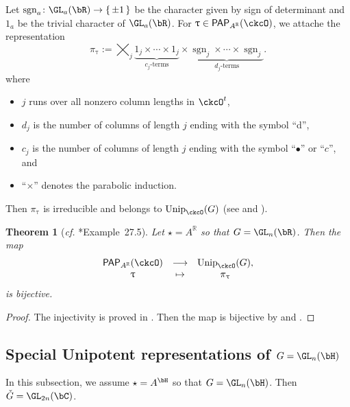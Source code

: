 \documentclass[12pt,a4paper]{amsart}
\newcommand{\sgn}{\operatorname{sgn}}
\newcommand{\R}{\mathbb R}
\numberwithin{equation}{section}
\newtheorem{thm}{Theorem}[section]
\theoremstyle{remark}
\def\cf{\emph{cf.} }
\def\Unip{\mathrm{Unip}}
\def\ckG{\check{G}}
\def\PP{\mathsf{PAP}}
\begin{document}
Let $\sgn_a\colon \GL_a(\bR)\rightarrow \set{\pm 1}$ be the character given by sign of determinant
and $1_a$ be the trivial character of $\GL_a(\bR)$.
For
$\uptau\in \PP_{A^\R}(\ckcO)$, we attache the representation
\begin{equation}\label{eq:u.GLR}
  \pi_\uptau :=
  \bigtimes_{j} \underbrace{1_j \times \cdots \times 1_j}_{c_j\text{-terms}}\times
  \underbrace{\sgn_j \times \cdots \times {\sgn_j} }_{d_j\text{-terms}}.
\end{equation}
where
\begin{itemize}
  \item $j$ runs over all nonzero column lengths in $\ckcO^t$,
  \item $d_j$ is the number of columns of length $j$ ending with the symbol
        ``d'',
  \item $c_j$ is the number of columns of length $j$ ending with the symbol
        ``$\bullet$'' or ``$c$'', and
  \item ``$\times$'' denotes the parabolic induction.
\end{itemize}
Then $\pi_{\uptau}$ is irreducible and belongs to $\Unip_{\ckcO}(G)$ (see  \cite[Theorem 3.8]{V.GL} and \cite[Example~27.5]{ABV}). 

\begin{thm}[\cf \cite{ABV}*{Example~27.5}] Let $\star =A^\R$ so that $G =\GL_n(\bR)$. Then the map
  \[
    \begin{array}{ccc}
      \PP_{A^\R}(\ckcO) & \longrightarrow & \Unip_{\ckcO}(G),\\
      \uptau & \mapsto & \pi_{\uptau}
    \end{array}
  \]
  is bijective. 
\end{thm}
\begin{proof}
  The injectivity is proved in  \cite[Theorem 3.8]{V.GL}.
Then   the map is bijective by  and .
\end{proof}

\subsection{Special Unipotent representations of $G=\GL_{n}(\bH)$} In this subsection, we assume $\star=A^{\bH}$ so that $G = \GL_{n}(\bH)$. Then 
$\ckG = \GL_{2n}(\bC)$. 
\end{document}
